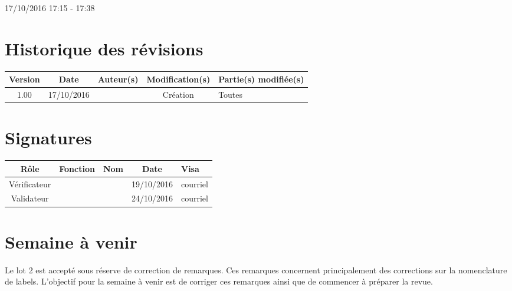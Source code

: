 \documentclass [a4paper] {article}
\begin{document}
17/10/2016			 				%
\hfill   
\hfill 	 17:15 - 17:38				%



\section*{Historique des révisions}
\begin{center}
			\begin{tabular}{| c | c | c | c | p{4cm} |}
				\hline
				\rowcolor{Gray}
				Version & Date & Auteur(s) & Modification(s) & Partie(s) modifiée(s)		 \\
				\hline
				1.00 & 17/10/2016 & \Kafui & Création & Toutes \\
		\hline		
			\end{tabular}
		\end{center}

\section*{Signatures}

		\begin{center}
			\begin{tabular}{| c | c | c | c | p{4cm} |}
				\hline
				\rowcolor{Gray}
				Rôle & Fonction & Nom & Date & Visa		 \\
				\hline
				Vérificateur & \RQ & \Melissa & 19/10/2016 & courriel \\[30pt]
				\hline
				Validateur & \CP & \Pierre & 24/10/2016 & courriel \\[30pt]	
				\hline
			\end{tabular}
		\end{center}

\section{Semaine à venir}
Le lot 2 est accepté sous réserve de correction de remarques. Ces remarques concernent principalement des corrections sur la nomenclature de labels. 
L'objectif pour la semaine à venir est de corriger ces remarques ainsi que de commencer à préparer la revue.




\end{document}
